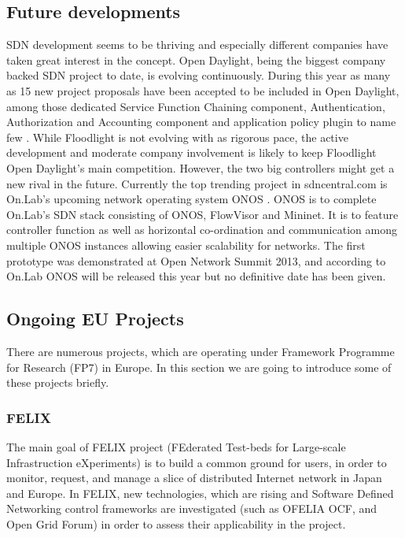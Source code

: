 \subsection{Future developments}

SDN development seems to be thriving and especially different companies have taken great interest in the concept. Open Daylight, being the biggest company backed SDN project to date, is evolving continuously. During this year as many as 15 new project proposals have been accepted to be included in Open Daylight, among those dedicated Service Function Chaining component, Authentication, Authorization and Accounting component and application policy plugin to name few \cite{projects}. While Floodlight is not evolving with as rigorous pace, the active development and moderate company involvement is likely to keep Floodlight Open Daylight's main competition. However, the two big controllers might get a new rival in the future. Currently the top trending project in sdncentral.com is On.Lab's upcoming network operating system ONOS \cite{SDNCentral, ONOS}. ONOS is to complete On.Lab's SDN stack consisting of ONOS, FlowVisor and Mininet. It is to feature controller function as well as horizontal co-ordination and communication among multiple ONOS instances allowing easier scalability for networks. The first prototype was demonstrated at Open Network Summit 2013, and according to On.Lab ONOS will be released this year but no definitive date has been given.

\subsection{Ongoing EU Projects}

There are numerous projects, which are operating under Framework Programme for Research (FP7) in Europe. In this section we are going to introduce some of these projects briefly. 

\subsubsection{FELIX}

The main goal of FELIX project (FEderated Test-beds for Large-scale Infrastruction eXperiments) is to build a common ground for users, in order to monitor, request, and manage a slice of distributed Internet network in Japan and Europe. In FELIX, new technologies, which are rising and Software Defined Networking control frameworks are investigated (such as OFELIA OCF, and Open Grid Forum) in order to assess their applicability in the project. \cite{FELIXproject}

